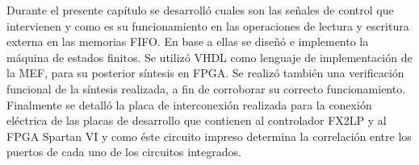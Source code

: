 Durante el presente capítulo se desarrolló cuales son las señales de control que intervienen y como es su funcionamiento en las operaciones de lectura y escritura externa en las memorias FIFO. En base a ellas se diseñó e implemento la máquina de estados finitos. 
Se utilizó VHDL como lenguaje de implementación de la MEF, para su posterior síntesis en FPGA. Se realizó también una verificación funcional de la síntesis realizada, a fin de corroborar su correcto funcionamiento.
Finalmente se detalló la placa de interconexión realizada para la conexión eléctrica de las placas de desarrollo que contienen al controlador FX2LP y al FPGA Spartan VI y como éste circuito impreso determina la correlación entre los puertos de cada uno de los circuitos integrados.